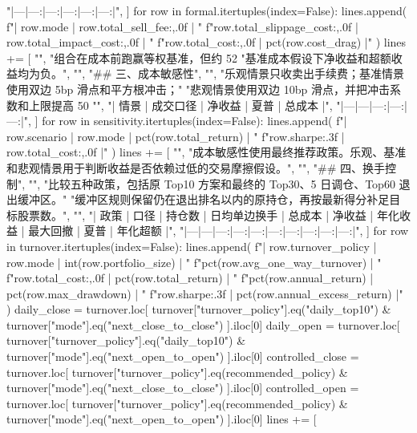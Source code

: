 \documentclass[UTF8,a4paper,fontset=fandol]{ctexart}
\begin{document}
\begin{ProjectCode}
{        "|---|---:|---:|---:|---:|---:|",
    ]
    for row in formal.itertuples(index=False):
        lines.append(
            f"| {row.mode} | {row.total_sell_fee:,.0f} | "
            f"{row.total_slippage_cost:,.0f} | {row.total_impact_cost:,.0f} | "
            f"{row.total_cost:,.0f} | {pct(row.cost_drag)} |"
        )
    lines += [
        "",
        "组合在成本前跑赢等权基准，但约 52%
        "基准成本假设下净收益和超额收益均为负。",
        "",
        "## 三、成本敏感性",
        "",
        "乐观情景只收卖出手续费；基准情景使用双边 5bp 滑点和平方根冲击；"
        "悲观情景使用双边 10bp 滑点，并把冲击系数和上限提高 50%
        "",
        "| 情景 | 成交口径 | 净收益 | 夏普 | 总成本 |",
        "|---|---|---:|---:|---:|",
    ]
    for row in sensitivity.itertuples(index=False):
        lines.append(
            f"| {row.scenario} | {row.mode} | {pct(row.total_return)} | "
            f"{row.sharpe:.3f} | {row.total_cost:,.0f} |"
        )
    lines += [
        "",
        "成本敏感性使用最终推荐政策。乐观、基准和悲观情景用于判断收益是否依赖过低的交易摩擦假设。",
        "",
        "## 四、换手控制",
        "",
        "比较五种政策，包括原 Top10 方案和最终的 Top30、5 日调仓、Top60 退出缓冲区。"
        "缓冲区规则保留仍在退出排名以内的原持仓，再按最新得分补足目标股票数。",
        "",
        "| 政策 | 口径 | 持仓数 | 日均单边换手 | 总成本 | 净收益 | 年化收益 | 最大回撤 | 夏普 | 年化超额 |",
        "|---|---|---:|---:|---:|---:|---:|---:|---:|---:|",
    ]
    for row in turnover.itertuples(index=False):
        lines.append(
            f"| {row.turnover_policy} | {row.mode} | {int(row.portfolio_size)} | "
            f"{pct(row.avg_one_way_turnover)} | "
            f"{row.total_cost:,.0f} | {pct(row.total_return)} | "
            f"{pct(row.annual_return)} | {pct(row.max_drawdown)} | "
            f"{row.sharpe:.3f} | {pct(row.annual_excess_return)} |"
        )
    daily_close = turnover.loc[
        turnover["turnover_policy"].eq("daily_top10")
        & turnover["mode"].eq("next_close_to_close")
    ].iloc[0]
    daily_open = turnover.loc[
        turnover["turnover_policy"].eq("daily_top10")
        & turnover["mode"].eq("next_open_to_open")
    ].iloc[0]
    controlled_close = turnover.loc[
        turnover["turnover_policy"].eq(recommended_policy)
        & turnover["mode"].eq("next_close_to_close")
    ].iloc[0]
    controlled_open = turnover.loc[
        turnover["turnover_policy"].eq(recommended_policy)
        & turnover["mode"].eq("next_open_to_open")
    ].iloc[0]
    lines += [
}
\end{ProjectCode}
\end{document}

